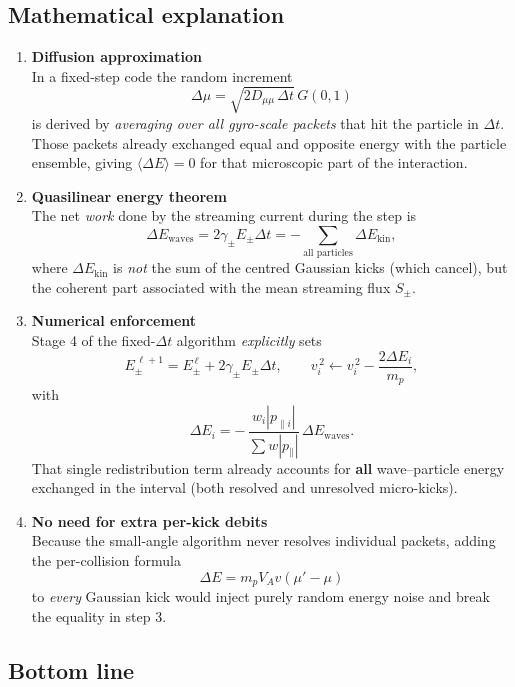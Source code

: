 {\subsection*{Mathematical explanation}

\begin{enumerate}
\item \textbf{Diffusion approximation} \\
In a fixed-step code the random increment
\[
\Delta\mu = \sqrt{2D_{\mu\mu}\,\Delta t}\,G(0,1)
\]
is derived by \emph{averaging over all gyro-scale packets} that hit the particle in $\Delta t$. Those packets already exchanged equal and opposite energy with the particle ensemble, giving $\langle \Delta E \rangle = 0$ for that microscopic part of the interaction.

\item \textbf{Quasilinear energy theorem} \\
The net \emph{work} done by the streaming current during the step is
\[
\Delta E_{\mathrm{waves}} = 2\gamma_\pm E_\pm \Delta t = -\sum_{\text{all particles}} \Delta E_{\mathrm{kin}},
\]
where $\Delta E_{\mathrm{kin}}$ is \emph{not} the sum of the centred Gaussian kicks (which cancel), but the coherent part associated with the mean streaming flux $S_\pm$.

\item \textbf{Numerical enforcement} \\
Stage 4 of the fixed-$\Delta t$ algorithm \emph{explicitly} sets
\[
E_\pm^{\,\ell+1} = E_\pm^{\,\ell} + 2\gamma_\pm E_\pm \Delta t,
\qquad
v_i^{\,2} \leftarrow v_i^{\,2} - \frac{2\Delta E_i}{m_p},
\]
with
\[
\Delta E_i = -\,\frac{w_i |p_{\parallel i}|}{\sum w |p_\parallel|}\,\Delta E_{\mathrm{waves}}.
\]
That single redistribution term already accounts for \textbf{all} wave–particle energy exchanged in the interval (both resolved and unresolved micro-kicks).

\item \textbf{No need for extra per-kick debits} \\
Because the small-angle algorithm never resolves individual packets, adding the per-collision formula
\[
\Delta E = m_p V_A v (\mu' - \mu)
\]
to \emph{every} Gaussian kick would inject purely random energy noise and break the equality in step 3.
\end{enumerate}

\subsection*{Bottom line}

}
